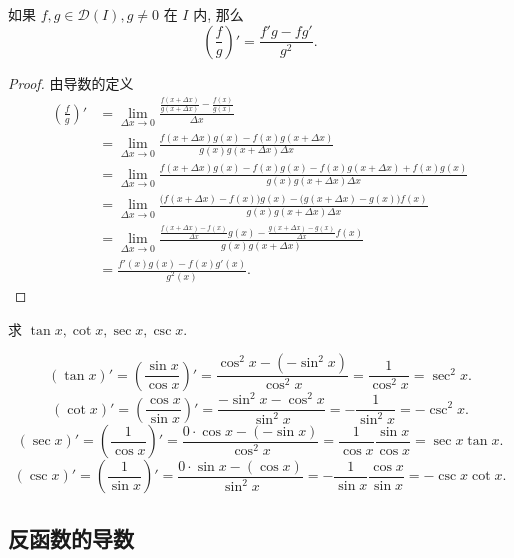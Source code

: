 \documentclass[cn,toc=twocol]{elegantbook}
\newcommand{\D}{\mathscr{D}}
\begin{document}
\begin{theorem}
	如果 $f,g \in \D(I), g \neq 0$ 在 $I$ 内, 那么
	\[
		\left(\frac fg \right)' = \frac{f'g - fg'}{g^2}.
	\]
\end{theorem}
\begin{proof}
	由导数的定义
	\[
	\begin{aligned}
		\left(\frac fg \right)' &=  \lim_{\Delta x \to 0} \frac{\frac{f(x+\Delta x)}{g(x+\Delta x)} - \frac{f(x)}{g(x)}}{\Delta x}\\
		&= \lim_{\Delta x \to 0} \frac{f(x+\Delta x)g(x) - f(x) g(x+\Delta x)}{g(x) g(x+\Delta x) \Delta x}\\
		&= \lim_{\Delta x \to 0} \frac{f(x+\Delta x)g(x) - f(x)g(x) - f(x) g(x+\Delta x) + f(x)g(x)}{g(x) g(x+\Delta x) \Delta x}\\
		&= \lim_{\Delta x \to 0} \frac{\bigl(f(x+\Delta x) - f(x)\bigr)g(x) - \bigl(g(x+\Delta x) - g(x)\bigr)f(x)}{g(x) g(x+\Delta x) \Delta x}\\
		&= \lim_{\Delta x \to 0} \frac{\frac{f(x+\Delta x) - f(x)}{\Delta x}g(x) - \frac{g(x+\Delta x) - g(x)}{\Delta x}f(x)}{g(x) g(x+\Delta x)}\\
		&= \frac{f'(x)g(x) - f(x)g'(x)}{g^2(x)}.
	\end{aligned}
	\]
\end{proof}
\vspace{1em}

\begin{example}
	求 $\tan x, \cot x, \sec x, \csc x$.
\end{example}
\begin{solution}
\[
	(\tan x)' = \left(\frac{\sin x}{\cos x}\right)' = \frac{\cos^2 x - (-\sin^2 x)}{\cos^2 x} = \frac{1}{\cos^2 x} = \sec^2 x.
\]
\[
	(\cot x)' = \left(\frac{\cos x}{\sin x}\right)' = \frac{-\sin^2 x - \cos^2 x}{\sin^2 x} = -\frac{1}{\sin^2 x} = -\csc^2 x.
\]
\[
	(\sec x)' = \left(\frac{1}{\cos x}\right)' = \frac{0\cdot\cos x - (-\sin x)}{\cos^2 x} = \frac{1}{\cos x}\frac{\sin x}{\cos x} =\sec x \tan x.
\]
\[
	(\csc x)' = \left(\frac{1}{\sin x}\right)' = \frac{0\cdot\sin x - (\cos x)}{\sin^2 x} = -\frac{1}{\sin x}\frac{\cos x}{\sin x} = -\csc x \cot x.
\]
\end{solution}

%	


\subsection{反函数的导数}
\end{document}
